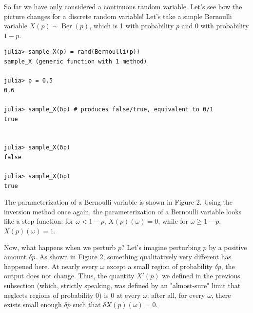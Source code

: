So far we have only considered a continuous random variable. Let's see how the picture changes for a discrete random 
variable! Let's take a simple Bernoulli variable $X(p) \sim \operatorname{Ber}(p)$, which is 1 with probability $p$ and
0 with probability $1-p$.
\begin{verbatim}
julia> sample_X(p) = rand(Bernoulli(p))
sample_X (generic function with 1 method)

julia> p = 0.5
0.6

julia> sample_X(δp) # produces false/true, equivalent to 0/1
true


julia> sample_X(δp)
false

julia> sample_X(δp)
true
\end{verbatim}
The parameterization of a Bernoulli variable is shown in Figure 2.
Using the inversion method once again, the parameterization of a Bernoulli variable looks like a step function:
for $\omega < 1-p$, $X(p)(\omega) = 0$, while for $\omega \geq 1-p$, $X(p)(\omega) = 1$.

Now, what happens when we perturb $p$? Let's imagine perturbing $p$ by a positive amount $\delta p$.
As shown in Figure 2, something qualitatively very different has happened here. At nearly every $\omega$ except a small region
of probability $\delta p$, the output does not change. Thus, the quantity $X'(p)$ we defined in the previous subsection 
(which, strictly speaking, was defined by an "almost-sure" limit that neglects regions of probability 0)
is 0 at every $\omega$: after all, for every $\omega$, there exists small enough $\delta p$ such that $\delta X(p)(\omega) = 0$.

